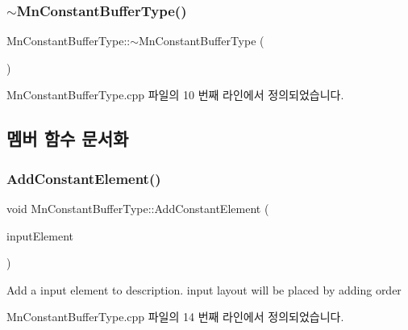 \subsubsection{\texorpdfstring{$\sim$\+Mn\+Constant\+Buffer\+Type()}{~MnConstantBufferType()}}
{\footnotesize\ttfamily Mn\+Constant\+Buffer\+Type\+::$\sim$\+Mn\+Constant\+Buffer\+Type (\begin{DoxyParamCaption}{ }\end{DoxyParamCaption})}



Mn\+Constant\+Buffer\+Type.\+cpp 파일의 10 번째 라인에서 정의되었습니다.



\subsection{멤버 함수 문서화}
\mbox{\label{class_m_n_l_1_1_mn_constant_buffer_type_ae9221d7fff984c158938611cf05666dc}} 
\subsubsection{\texorpdfstring{Add\+Constant\+Element()}{AddConstantElement()}}
{\footnotesize\ttfamily void Mn\+Constant\+Buffer\+Type\+::\+Add\+Constant\+Element (\begin{DoxyParamCaption}\item[{const \hyperlink{class_m_n_l_1_1_mn_constant_element}{Mn\+Constant\+Element} \&}]{input\+Element }\end{DoxyParamCaption})}

Add a input element to description. input layout will be placed by adding order 

Mn\+Constant\+Buffer\+Type.\+cpp 파일의 14 번째 라인에서 정의되었습니다.

\mbox{\label{class_m_n_l_1_1_mn_constant_buffer_type_a4e5740ac5ebdcf8dc0473721c0a6391f}} 
